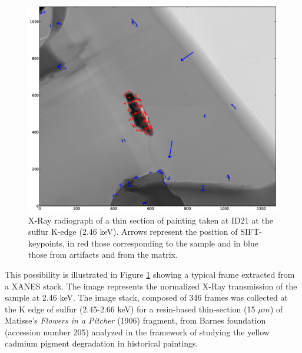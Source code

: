 \documentclass[preprint]{iucr}
\begin{document}
\begin{figure}
\label{fig:sample}
\begin{center}
\includegraphics[width=15cm]{features.eps}
\caption{ X-Ray radiograph of a thin section of painting
taken at ID21 at the suflur K-edge (2.46 keV). Arrows represent the position of
SIFT-keypoints, in red those corresponding to the sample and in blue those from artifacts and from
the matrix.}
\end{center}
\end{figure}

This possibility is illustrated in Figure \ref{fig:sample} showing a typical
frame extracted from a XANES stack.
The image represents the normalized X-Ray transmission of the sample at 2.46
keV.
The image stack, composed of 346 frames was collected at the K edge of sulfur
(2.45-2.66 keV) for a resin-based thin-section
(15 $\mu m$) of Matisse’s \emph{Flowers in a Pitcher} (1906) fragment, from
Barnes foundation (accession number 205) analyzed in the framework of studying the
yellow cadmium pigment degradation in historical paintings.
\end{document}
